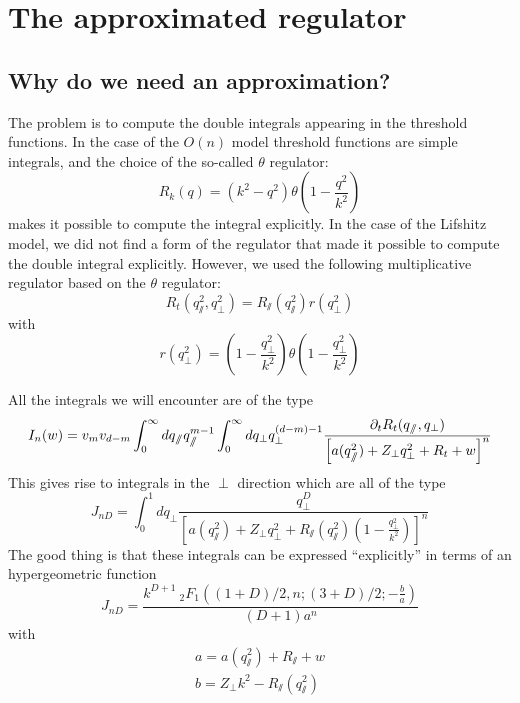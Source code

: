 \chapter{The approximated regulator}
\label{app:approx}
\section{Why do we need an approximation?}

The problem is to compute the double integrals appearing in the threshold functions. 
In the case of the $O(n)$ model threshold functions are simple integrals, and the choice of the so-called $\theta$ regulator:
\begin{equation}
R_k(q) = (k^2 - q^2) \theta\left(1-\frac{q^2}{k^2}\right) 
\end{equation}
makes it possible to compute the integral explicitly. 
In the case of the Lifshitz model, we did not find a form of the regulator that made it possible to compute the double integral explicitly. 
However, we used the following multiplicative regulator based on the $\theta$ regulator:
\begin{equation}
R_t(q_\sslash^2, q_\perp^2) = R_\sslash(q_\sslash^2) r(q_\perp^2)
\end{equation}
with
\begin{equation}
r(q_\perp^2) = \left( 1 -\frac{q_\perp^2}{k^2} \right) \theta\left(1-\frac{q_\perp^2}{k^2} \right)
\end{equation}

All the integrals we will encounter are of the type
\begin{equation}
I_n(w) = v_m v_{d-m} \int_0^{\infty} dq_\sslash q_\sslash^{m-1} \int_0^{\infty} dq_\perp q_\perp^{(d-m)-1} \frac{\partial_{t} R_t(q_\sslash, q_\perp)}{\left[ a(q_\sslash^2) + Z_\perp q_\perp^2 + R_t + w \right]^n}
\end{equation}
This gives rise to integrals in the $\perp$ direction which are all of the type
\begin{equation}
J_{nD} = \int_0^{1} dq_\perp \frac{q_\perp^D}{\left[ a(q_\sslash^2) + Z_\perp q_\perp^2 + R_\sslash(q_\sslash^2) \left(1-\frac{q_\perp^2}{k^2} \right) \right]^n}
\end{equation}
The good thing is that these integrals can be expressed ``explicitly'' in terms of an hypergeometric function
\begin{equation}
J_{nD} = \frac{k^{D+1} \ _2F_1\left((1+D)/2,n;(3+D)/2;-\frac{b}{a}\right)}{(D+1)a^{n}}
\end{equation}
with
\begin{align}
a = a(q_\sslash^2) + R_\sslash + w \\
b = Z_\perp k^2 - R_\sslash(q_\sslash^2)
\end{align}

